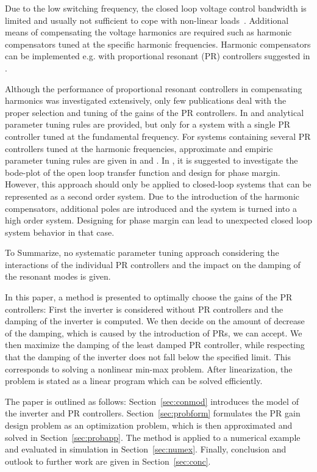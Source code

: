\documentclass[conference,10pt]{IEEEtran}
\begin{document}
Due to the low switching frequency, the closed loop voltage control bandwidth is limited and usually not sufficient to cope with non-linear loads~\cite{almer2009harmonic}. Additional means of compensating the voltage harmonics are required such as harmonic compensators tuned at the specific harmonic frequencies. Harmonic compensators can be implemented e.g. with proportional resonant (PR) controllers suggested in \cite{924769,4270758,6408064,6153368,993175,5398914,989372}.

Although the performance of proportional resonant controllers in compensating harmonics was investigated extensively, only few publications deal with the proper selection and tuning of the gains of the PR controllers. In \cite{5338054} and \cite{6870109} analytical parameter tuning rules are provided, but only for a system with a single PR controller tuned at the fundamental frequency. For systems containing several PR controllers tuned at the harmonic frequencies, approximate and empiric parameter tuning rules are given in \cite{924769} and \cite{6153368}. In \cite{5398914}, it is suggested to investigate the bode-plot of the open loop transfer function and design for phase margin. However, this approach should only be applied to closed-loop systems that can be represented as a second order system. Due to the introduction of the harmonic compensators, additional poles are introduced and the system is turned into a high order system. Designing for phase margin can lead to unexpected closed loop system behavior in that case.

To Summarize, no systematic parameter tuning approach considering the interactions of the individual PR controllers and the impact on the damping of the resonant modes is given.

In this paper, a method is presented to optimally choose the gains of the PR controllers: First the inverter is considered without PR controllers and the damping of the inverter is computed. We then decide on the amount of decrease of the damping, which is caused by the introduction of PRs, we can accept. We then maximize the damping of the least damped PR controller, while respecting that the damping of the inverter does not fall below the specified limit. This corresponds to solving a nonlinear min-max problem. After linearization, the problem is stated as a linear program which can be solved efficiently.


The paper is outlined as follows:
Section~\ref{sec:conmod}  introduces the model of the inverter and PR controllers.
Section~\ref{sec:probform} formulates the PR gain design problem as an optimization problem, which is then approximated and solved in Section~\ref{sec:probapp}.
The method is applied to a numerical example and evaluated in simulation in Section~\ref{sec:numex}.
Finally, conclusion and outlook to further work are given
in Section~\ref{sec:conc}.
\end{document}
